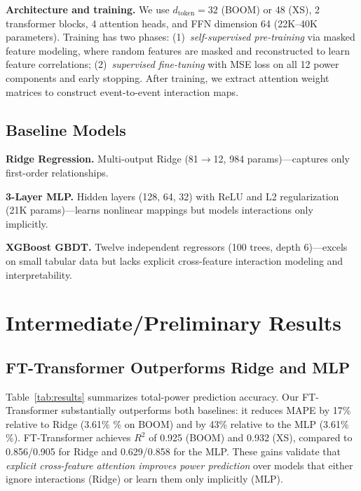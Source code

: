 \documentclass[10pt,twocolumn,letterpaper]{article}
\begin{document}
\noindent\textbf{Architecture and training.}
We use $d_\text{token}{=}32$ (BOOM) or 48 (XS), 2 transformer blocks,
4 attention heads, and FFN dimension 64 (22K--40K parameters).
Training has two phases: (1)~\emph{self-supervised pre-training} via masked
feature modeling, where random features are masked and reconstructed to
learn feature correlations; (2)~\emph{supervised fine-tuning} with MSE loss
on all 12 power components and early stopping.  After training, we extract
attention weight matrices to construct event-to-event interaction maps.

\subsection{Baseline Models}

\noindent\textbf{Ridge Regression.}  Multi-output Ridge
(81$\to$12, 984 params)---captures only first-order relationships.

\noindent\textbf{3-Layer MLP.}  Hidden layers (128, 64, 32) with ReLU and
L2 regularization (21K params)---learns nonlinear mappings but models
interactions only implicitly.

\noindent\textbf{XGBoost GBDT.}  Twelve independent regressors (100 trees,
depth 6)---excels on small tabular data but lacks explicit cross-feature
interaction modeling and interpretability.

\section{Intermediate/Preliminary Results}

\subsection{FT-Transformer Outperforms Ridge and MLP}

Table~\ref{tab:results} summarizes total-power prediction accuracy.  Our
FT-Transformer substantially outperforms both baselines: it reduces MAPE
by 17\% relative to Ridge (3.61\% \% on BOOM) and by 43\% relative
to the MLP (3.61\% \%).  FT-Transformer achieves $R^2$ of 0.925
(BOOM) and 0.932 (XS), compared to 0.856/0.905 for Ridge and 0.629/0.858
for the MLP.  These gains validate that \emph{explicit cross-feature
attention improves power prediction} over models that either ignore
interactions (Ridge) or learn them only implicitly (MLP).
\end{document}
